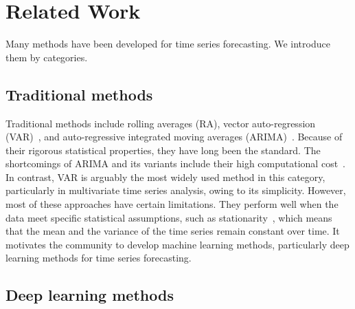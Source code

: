 \section{Related Work} \label{sec:related-work}

Many methods have been developed for time series forecasting.
We introduce them by categories.

\subsection{Traditional methods} %

Traditional methods include rolling averages (RA), vector auto-regression (VAR)~\cite{lai2018modeling, box2015time}, and auto-regressive integrated moving averages (ARIMA)~\cite{elsayed2021we, box1970distribution, box2015time}.
Because of their rigorous statistical properties, they have long been the standard.
The shortcomings of ARIMA and its variants include their high computational cost~\cite{lai2018modeling}. 
In contrast, VAR is arguably the most widely used method in this category, particularly in multivariate time series analysis, owing to its simplicity.
%
However, most of these approaches have certain limitations.
%
They perform well when the data meet specific statistical assumptions, such as stationarity~\cite{lim2021timeseries}, which means that the mean and the variance of the time series remain constant over time.
%
It motivates the community to develop machine learning methods, particularly deep learning methods for time series forecasting. 

\subsection{Deep learning methods} %

